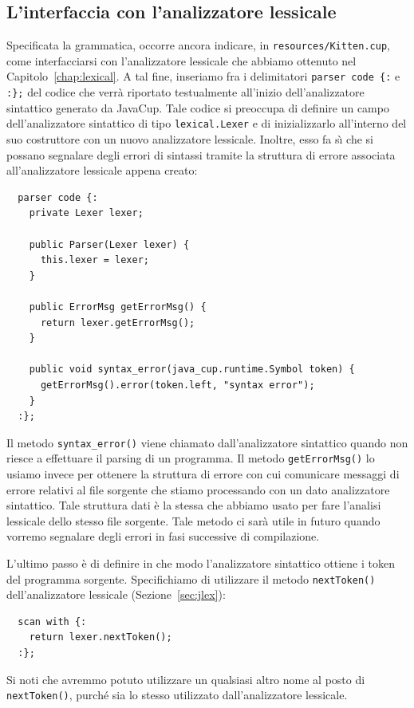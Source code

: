 \subsection{L'interfaccia con l'analizzatore lessicale}
  \label{subsec:jlex_and_java_cup}
%
Specificata la grammatica, occorre ancora indicare, in
\texttt{resources/Kitten.cup}, come interfacciarsi con
l'analizzatore lessicale che abbiamo ottenuto nel Capitolo~\ref{chap:lexical}.
A tal fine, inseriamo fra i delimitatori
\verb!parser code {:! e \verb!:};! del codice che verr\`a
riportato testualmente all'inizio dell'analizzatore sintattico
generato da JavaCup. Tale codice si preoccupa di definire un campo
dell'analizzatore sintattico
di tipo \texttt{lexical.Lexer} e di inizializzarlo all'interno del suo
costruttore con un nuovo analizzatore lessicale. Inoltre, esso fa s\`{\i} che
si possano segnalare degli errori di sintassi tramite la struttura di errore
associata all'analizzatore lessicale appena creato:
%
\begin{verbatim}
  parser code {:
    private Lexer lexer;

    public Parser(Lexer lexer) {
      this.lexer = lexer;
    }

    public ErrorMsg getErrorMsg() {
      return lexer.getErrorMsg();
    }

    public void syntax_error(java_cup.runtime.Symbol token) {
      getErrorMsg().error(token.left, "syntax error");
    }
  :};
\end{verbatim}
%
Il metodo \texttt{syntax\_error()} viene chiamato
dall'analizzatore sintattico quando non riesce a effettuare il parsing
di un programma. Il metodo \texttt{getErrorMsg()} lo usiamo invece per
ottenere la struttura di errore con cui comunicare messaggi di errore
relativi al file sorgente che stiamo processando con un dato analizzatore
sintattico. Tale struttura dati \`e la stessa che abbiamo usato per fare
l'analisi lessicale dello stesso file sorgente. Tale metodo ci sar\`a
utile in futuro quando vorremo segnalare degli errori in fasi successive
di compilazione.

L'ultimo passo \`e di definire in che modo l'analizzatore sintattico
ottiene i token del programma sorgente. Specifichiamo di
utilizzare il metodo \texttt{nextToken()} dell'analizzatore lessicale
(Sezione~\ref{sec:jlex}):
%
\begin{verbatim}
  scan with {:
    return lexer.nextToken();
  :};
\end{verbatim}
%
Si noti che avremmo potuto utilizzare un qualsiasi altro nome al posto di
\texttt{nextToken()}, purch\'e sia lo stesso utilizzato
dall'analizzatore lessicale.

